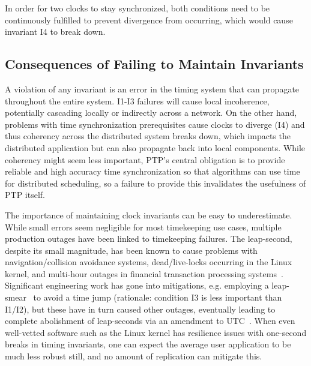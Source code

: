 In order for two clocks to stay synchronized, both conditions need to be continuously fulfilled to prevent divergence from occurring, which would cause invariant I4 to break down.

\subsection{Consequences of Failing to Maintain Invariants}
A violation of any invariant is an error in the timing system that can propagate throughout the entire system.
I1-I3 failures will cause local incoherence, potentially cascading locally or indirectly across a network. On the other hand, problems with time synchronization prerequisites cause clocks to diverge (I4) and thus coherency across the distributed system breaks down, which impacts the distributed application but can also propagate back into local components.
While coherency might seem less important, PTP's central obligation is to provide reliable and high accuracy time synchronization so that algorithms can use time for distributed scheduling, so a failure to provide this invalidates the usefulness of PTP itself.

The importance of maintaining clock invariants can be easy to underestimate. While small errors seem negligible for most timekeeping use cases, multiple production outages have been linked to timekeeping failures.
The leap-second, despite its small magnitude, has been known to cause problems with navigation/collision avoidance systems, dead/live-locks occurring in the Linux kernel, and multi-hour outages in financial transaction processing systems~\cite{leap-seconds-recap}.
Significant engineering work has gone into mitigations, e.g. employing a leap-smear~\cite{leap-second-google, leap-second-technical-aspects} to avoid a time jump (rationale: condition I3 is less important than I1/I2), but these have in turn caused other outages,
eventually leading to complete abolishment of leap-seconds via an amendment to UTC~\cite{leap-second-resolution,leap-second-facebook-abolish}.
When even well-vetted software such as the Linux kernel has resilience issues with one-second breaks in timing invariants, one can expect the average user application to be much less robust still, and no amount of replication can mitigate this.

